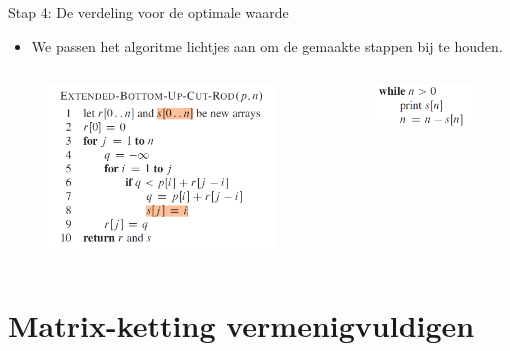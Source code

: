 \documentclass
   [kulak] %
   {kulakbeamer}
\begin{document}
\begin{frame}{Stap 4: De verdeling voor de optimale waarde}
    \begin{itemize}
        \item We passen het algoritme lichtjes aan om de gemaakte stappen bij te houden.
    \end{itemize}
    \begin{columns}
        \begin{figure}
            \centering
            \includegraphics[width=\linewidth]{extendedbottomupcutrod.png}
        \end{figure}
        \begin{figure}
            \centering
            \includegraphics[width=\linewidth]{solution.png}
        \end{figure}
    \end{columns}
\end{frame}

\section{Matrix-ketting vermenigvuldigen}
\end{document}
